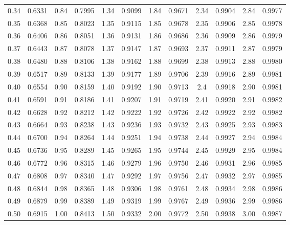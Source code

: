 \begin{table}
\begin{otherlanguage}{english}
\begin{tabular}{|C|C||C|C||C|C||C|C||C|C||C|C|}
0.34 & 0.6331 & 0.84 & 0.7995 & 1.34 & 0.9099 & 1.84 & 0.9671 & 2.34 & 0.9904 & 2.84 & 0.9977 \\
0.35 & 0.6368 & 0.85 & 0.8023 & 1.35 & 0.9115 & 1.85 & 0.9678 & 2.35 & 0.9906 & 2.85 & 0.9978 \\[1ex]
0.36 & 0.6406 & 0.86 & 0.8051 & 1.36 & 0.9131 & 1.86 & 0.9686 & 2.36 & 0.9909 & 2.86 & 0.9979 \\
0.37 & 0.6443 & 0.87 & 0.8078 & 1.37 & 0.9147 & 1.87 & 0.9693 & 2.37 & 0.9911 & 2.87 & 0.9979 \\
0.38 & 0.6480 & 0.88 & 0.8106 & 1.38 & 0.9162 & 1.88 & 0.9699 & 2.38 & 0.9913 & 2.88 & 0.9980 \\
0.39 & 0.6517 & 0.89 & 0.8133 & 1.39 & 0.9177 & 1.89 & 0.9706 & 2.39 & 0.9916 & 2.89 & 0.9981 \\
0.40 & 0.6554 & 0.90 & 0.8159 & 1.40 & 0.9192 & 1.90 & 0.9713 & 2.4 & 0.9918 & 2.90 & 0.9981 \\[1ex]
0.41 & 0.6591 & 0.91 & 0.8186 & 1.41 & 0.9207 & 1.91 & 0.9719 & 2.41 & 0.9920 & 2.91 & 0.9982 \\
0.42 & 0.6628 & 0.92 & 0.8212 & 1.42 & 0.9222 & 1.92 & 0.9726 & 2.42 & 0.9922 & 2.92 & 0.9982 \\
0.43 & 0.6664 & 0.93 & 0.8238 & 1.43 & 0.9236 & 1.93 & 0.9732 & 2.43 & 0.9925 & 2.93 & 0.9983 \\
0.44 & 0.6700 & 0.94 & 0.8264 & 1.44 & 0.9251 & 1.94 & 0.9738 & 2.44 & 0.9927 & 2.94 & 0.9984 \\
0.45 & 0.6736 & 0.95 & 0.8289 & 1.45 & 0.9265 & 1.95 & 0.9744 & 2.45 & 0.9929 & 2.95 & 0.9984 \\[1ex]
0.46 & 0.6772 & 0.96 & 0.8315 & 1.46 & 0.9279 & 1.96 & 0.9750 & 2.46 & 0.9931 & 2.96 & 0.9985 \\
0.47 & 0.6808 & 0.97 & 0.8340 & 1.47 & 0.9292 & 1.97 & 0.9756 & 2.47 & 0.9932 & 2.97 & 0.9985 \\
0.48 & 0.6844 & 0.98 & 0.8365 & 1.48 & 0.9306 & 1.98 & 0.9761 & 2.48 & 0.9934 & 2.98 & 0.9986 \\
0.49 & 0.6879 & 0.99 & 0.8389 & 1.49 & 0.9319 & 1.99 & 0.9767 & 2.49 & 0.9936 & 2.99 & 0.9986 \\
0.50 & 0.6915 & 1.00 & 0.8413 & 1.50 & 0.9332 & 2.00 & 0.9772 & 2.50 & 0.9938 & 3.00 & 0.9987 \\
\hline
\end{tabular}
\end{otherlanguage}
\end{table}
\,%
